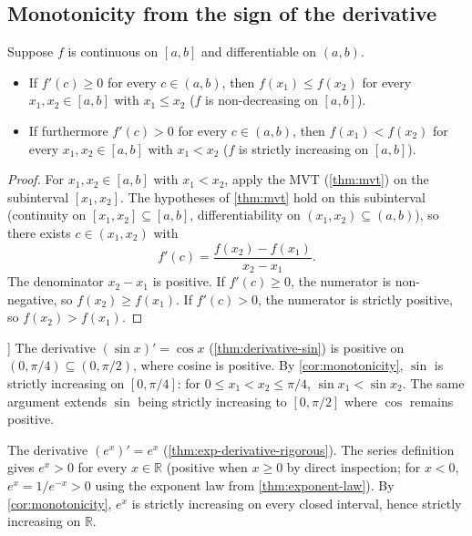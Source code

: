 \subsection{Monotonicity from the sign of the derivative}

\begin{corollary}\label{cor:monotonicity}
Suppose \(f\) is continuous on \([a, b]\) and differentiable on \((a, b)\).
\begin{itemize}
    \item If \(f'(c) \geq 0\) for every \(c \in (a, b)\), then \(f(x_{1}) \leq f(x_{2})\) for every \(x_{1}, x_{2} \in [a, b]\) with \(x_{1} \leq x_{2}\) (\(f\) is non-decreasing on \([a, b]\)).
    \item If furthermore \(f'(c) > 0\) for every \(c \in (a, b)\), then \(f(x_{1}) < f(x_{2})\) for every \(x_{1}, x_{2} \in [a, b]\) with \(x_{1} < x_{2}\) (\(f\) is strictly increasing on \([a, b]\)).
\end{itemize}
\end{corollary}

\begin{proof}
For \(x_{1}, x_{2} \in [a, b]\) with \(x_{1} < x_{2}\), apply the MVT (\cref{thm:mvt}) on the subinterval \([x_{1}, x_{2}]\). The hypotheses of \cref{thm:mvt} hold on this subinterval (continuity on \([x_{1}, x_{2}] \subseteq [a, b]\), differentiability on \((x_{1}, x_{2}) \subseteq (a, b)\)), so there exists \(c \in (x_{1}, x_{2})\) with
\[
f'(c) = \frac{f(x_{2}) - f(x_{1})}{x_{2} - x_{1}}.
\]
The denominator \(x_{2} - x_{1}\) is positive. If \(f'(c) \geq 0\), the numerator is non-negative, so \(f(x_{2}) \geq f(x_{1})\). If \(f'(c) > 0\), the numerator is strictly positive, so \(f(x_{2}) > f(x_{1})\).
\end{proof}

\begin{example}[Sine on \([0, \pi/4]\)]
The derivative \((\sin x)' = \cos x\) (\cref{thm:derivative-sin}) is positive on \((0, \pi/4) \subseteq (0, \pi/2)\), where cosine is positive. By \cref{cor:monotonicity}, \(\sin\) is strictly increasing on \([0, \pi/4]\): for \(0 \leq x_{1} < x_{2} \leq \pi/4\), \(\sin x_{1} < \sin x_{2}\). The same argument extends \(\sin\) being strictly increasing to \([0, \pi/2]\) where \(\cos\) remains positive.
\end{example}

\begin{example}\label{ex:exp-strictly-increasing}
The derivative \((e^{x})' = e^{x}\) (\cref{thm:exp-derivative-rigorous}). The series definition gives \(e^{x} > 0\) for every \(x \in \mathbb{R}\) (positive when \(x \geq 0\) by direct inspection; for \(x < 0\), \(e^{x} = 1/e^{-x} > 0\) using the exponent law from \cref{thm:exponent-law}). By \cref{cor:monotonicity}, \(e^{x}\) is strictly increasing on every closed interval, hence strictly increasing on \(\mathbb{R}\).
\end{example}

